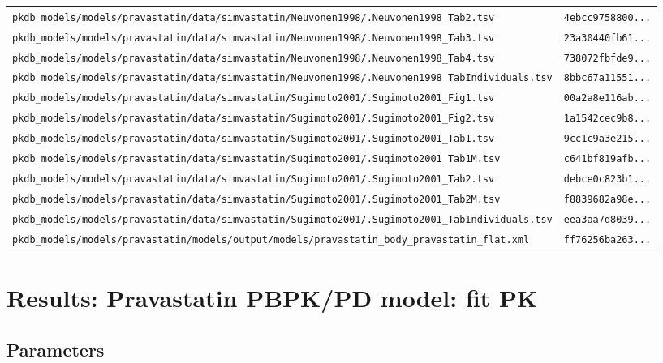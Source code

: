 \begin{longtable}{ll}
\texttt{pkdb\_models/models/pravastatin/data/simvastatin/Neuvonen1998/.Neuvonen1998\_Tab2.tsv} & \texttt{4ebcc9758800...} \\
\texttt{pkdb\_models/models/pravastatin/data/simvastatin/Neuvonen1998/.Neuvonen1998\_Tab3.tsv} & \texttt{23a30440fb61...} \\
\texttt{pkdb\_models/models/pravastatin/data/simvastatin/Neuvonen1998/.Neuvonen1998\_Tab4.tsv} & \texttt{738072fbfde9...} \\
\texttt{pkdb\_models/models/pravastatin/data/simvastatin/Neuvonen1998/.Neuvonen1998\_TabIndividuals.tsv} & \texttt{8bbc67a11551...} \\
\texttt{pkdb\_models/models/pravastatin/data/simvastatin/Sugimoto2001/.Sugimoto2001\_Fig1.tsv} & \texttt{00a2a8e116ab...} \\
\texttt{pkdb\_models/models/pravastatin/data/simvastatin/Sugimoto2001/.Sugimoto2001\_Fig2.tsv} & \texttt{1a1542cec9b8...} \\
\texttt{pkdb\_models/models/pravastatin/data/simvastatin/Sugimoto2001/.Sugimoto2001\_Tab1.tsv} & \texttt{9cc1c9a3e215...} \\
\texttt{pkdb\_models/models/pravastatin/data/simvastatin/Sugimoto2001/.Sugimoto2001\_Tab1M.tsv} & \texttt{c641bf819afb...} \\
\texttt{pkdb\_models/models/pravastatin/data/simvastatin/Sugimoto2001/.Sugimoto2001\_Tab2.tsv} & \texttt{debce0c823b1...} \\
\texttt{pkdb\_models/models/pravastatin/data/simvastatin/Sugimoto2001/.Sugimoto2001\_Tab2M.tsv} & \texttt{f8839682a98e...} \\
\texttt{pkdb\_models/models/pravastatin/data/simvastatin/Sugimoto2001/.Sugimoto2001\_TabIndividuals.tsv} & \texttt{eea3aa7d8039...} \\
\texttt{pkdb\_models/models/pravastatin/models/output/models/pravastatin\_body\_pravastatin\_flat.xml} & \texttt{ff76256ba263...} \\
\end{longtable}

\section{Results: Pravastatin PBPK/PD model: fit PK}

\subsection{Parameters}

